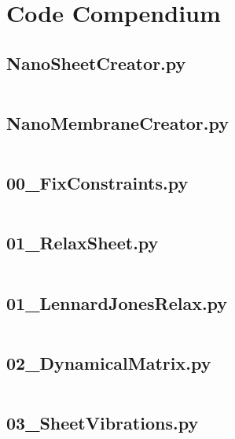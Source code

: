 
\appendix
\appendixpage
\addappheadtotoc
\section{Code Compendium}\label{CoCo}
\subsection{NanoSheetCreator.py}
\inputminted[python3=true,bgcolor=Black,linenos=true]{python}{VNL/PythonScripts/Scripts/NanoSheetCreator.py}
\subsection{NanoMembraneCreator.py}
\inputminted[python3=true,bgcolor=Black,linenos=true]{python}{VNL/PythonScripts/Scripts/NanoMembraneCreator.py}
\subsection{00\_FixConstraints.py}
\inputminted[python3=true,bgcolor=Black,linenos=true]{python}{VNL/PythonScripts/Scripts/00_FixConstraints.py}
\subsection{01\_RelaxSheet.py}
\inputminted[python3=true,bgcolor=Black,linenos=true]{python}{VNL/PythonScripts/Scripts/01_RelaxSheet.py}
\subsection{01\_LennardJonesRelax.py}
\inputminted[python3=true,bgcolor=Black,linenos=true]{python}{VNL/PythonScripts/Scripts/01_LennardJonesRelax.py}
\subsection{02\_DynamicalMatrix.py}
\inputminted[python3=true,bgcolor=Black,linenos=true]{python}{VNL/PythonScripts/Scripts/02_DynamicalMatrix.py}
\subsection{03\_SheetVibrations.py}
\inputminted[python3=true,bgcolor=Black,linenos=true]{python}{VNL/PythonScripts/Scripts/03_SheetVibrations.py}
